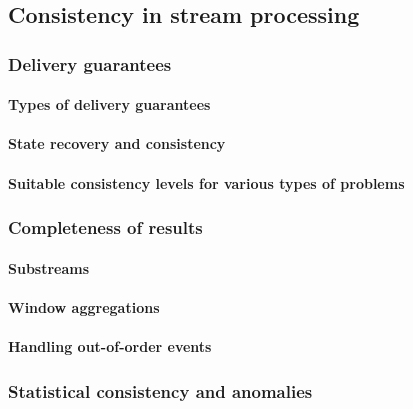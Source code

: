 \subsection{Consistency in stream processing}

\subsubsection{Delivery guarantees}

\paragraph{Types of delivery guarantees}
\cite{carbone2018scalable}

\paragraph{State recovery and consistency}
\cite{carbone2018scalable}

\paragraph{Suitable consistency levels for various types of problems}
\cite{boden2017distributed}

\subsubsection{Completeness of results}

\paragraph{Substreams}
\cite{Tucker:2003:EPS:776752.776780}

\paragraph{Window aggregations}
\cite{verwiebe2023survey}

\paragraph{Handling out-of-order events}
\cite{traub2018scotty, wang2021consistency}

\subsubsection{Statistical consistency and anomalies}
\cite{tellis2018detecting}

